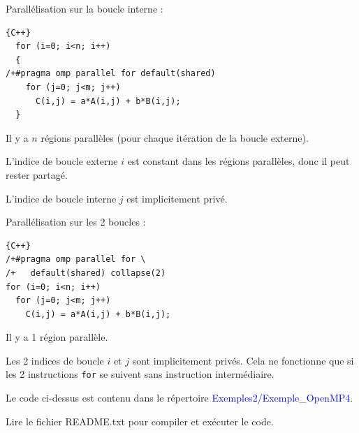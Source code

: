 \documentclass{beamer}
\begin{document}
\begin{frame}[fragile]
	Parallélisation sur la boucle interne :
	
	\begin{lstlisting}{C++}
  for (i=0; i<n; i++)
  {
/+#pragma omp parallel for default(shared)
    for (j=0; j<m; j++)
      C(i,j) = a*A(i,j) + b*B(i,j);
  }
	\end{lstlisting}
	\vfill
	Il y a $n$ régions parallèles (pour chaque itération de la boucle externe).
	
	\vfill
	L'indice de boucle externe $i$ est constant dans les régions parallèles, donc il peut rester partagé.

	\vfill
	L'indice de boucle interne $j$ est implicitement privé.
	\vfill
\end{frame}


\begin{frame}[fragile]
	Parallélisation sur les 2 boucles :
	
	\begin{lstlisting}{C++}
/+#pragma omp parallel for \
/+   default(shared) collapse(2)
for (i=0; i<n; i++)
  for (j=0; j<m; j++)
    C(i,j) = a*A(i,j) + b*B(i,j);
\end{lstlisting}
	\vfill
	Il y a 1 région parallèle.
		
	\vfill
	Les 2 indices de boucle $i$ et $j$ sont implicitement privés.
	\vfill
	Cela ne fonctionne que si les 2 instructions \verb|for| se suivent sans instruction intermédiaire.
\end{frame}

\begin{frame}
	Le code ci-dessus est contenu dans le répertoire \textcolor{blue}{Exemples2/Exemple\_OpenMP4}.
	
	Lire le fichier README.txt pour compiler et exécuter le code.
	
\end{frame}



\begin{frame}
\end{frame}

\begin{frame}
\end{frame}
\end{document}
